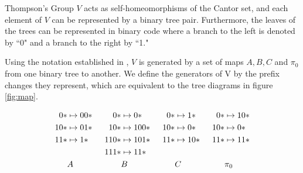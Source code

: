 \documentclass[11pt]{amsart}
\theoremstyle{plain}
\theoremstyle{remark}
\theoremstyle{definition}
\theoremstyle{remark}
\theoremstyle{named}
\begin{document}
Thompson's Group $V$ acts as self-homeomorphisms of the Cantor set, and each element of $V$ can be represented by a binary tree pair. Furthermore, the leaves of the trees can be represented in binary code where a branch to the left is denoted by ``0" and a branch to the right by ``1."

Using the notation established in \cite{CannJ}, $V$ is generated by a set of maps $A, B, C $ and $\pi_0$ from one binary tree to another. We define the generators of V by the prefix changes they represent, which are equivalent to the tree diagrams in figure \ref{fig:map}.

\begin{gather*}
\begin{aligned}[c]
0* &\mapsto 00* \\
10* &\mapsto 01* \\
11* &\mapsto 1* \\
\\
&A
\end{aligned}
\begin{aligned}
\indent    \\
\indent    \\
\indent    \\
\indent    \\  
\end{aligned}
\begin{aligned}[c]
0* &\mapsto 0* \\
10* &\mapsto 100* \\
110* &\mapsto 101* \\
111* &\mapsto 11* \\
&B
\end{aligned}
\begin{aligned}
\indent    \\
\indent    \\
\indent    \\
\indent    \\  
\end{aligned}
\begin{aligned}[c]
0* &\mapsto 1* \\
10* &\mapsto 0* \\
11* &\mapsto 10* \\
\\
&C
\end{aligned}
\begin{aligned}
\indent    \\
\indent    \\
\indent    \\
\indent    \\  
\end{aligned}
\begin{aligned}[c]
0* &\mapsto 10* \\
10* &\mapsto 0* \\
11* &\mapsto 11* \\
\\
&\pi_0
\end{aligned}
\end{gather*}
\end{document}
